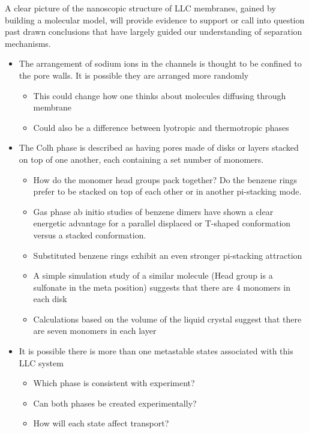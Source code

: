 \documentclass{article}
\begin{document}
	A clear picture of the nanoscopic structure of LLC membranes, gained by building a molecular model, will provide evidence to support or call into question past drawn conclusions that have largely guided our understanding of separation mechanisms. 
	\begin{itemize}
		\item The arrangement of sodium ions in the channels is thought to be confined to the pore walls. It is possible they are arranged more randomly
		\begin{itemize}
			\item This could change how one thinks about molecules diffusing through membrane
			\item Could also be a difference between lyotropic and thermotropic phases
		\end{itemize}
		\item The Colh phase is described as having pores made of disks or layers stacked on top of one another, each containing a set number of monomers. 
		\begin{itemize}
			\item How do the monomer head groups pack together? Do the benzene rings prefer to be stacked on top of each other or in another pi-stacking mode.
			\item Gas phase ab initio studies of benzene dimers have shown a clear energetic advantage for a parallel displaced or T-shaped conformation versus a stacked conformation. 
			\item Substituted benzene rings exhibit an even stronger pi-stacking attraction %
			\item A simple simulation study of a similar molecule (Head group is a sulfonate in the meta position) suggests that there are 4 monomers in each disk
			\item Calculations based on the volume of the liquid crystal suggest that there are seven monomers in each layer %
		\end{itemize}
		\item It is possible there is more than one metastable states associated with this LLC system
		\begin{itemize}
			\item Which phase is consistent with experiment?
			\item Can both phases be created experimentally?
			\item How will each state affect transport?
		\end{itemize}
	\end{itemize}
	
\end{document}
